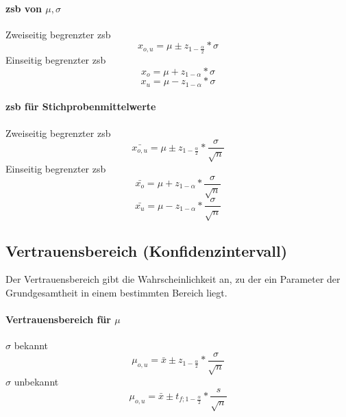 \documentclass{school}
\begin{document}
\paragraph{\gls{zsb} von $\mu,\sigma$}
\begin{outline}
\1 Zweiseitig begrenzter \gls{zsb}
$$x_{o,u} = \mu \pm z_{1 - \frac{\alpha}{2}} * \sigma$$
\1 Einseitig begrenzter \gls{zsb}
$$x_{o} = \mu + z_{1 - \alpha} * \sigma$$
$$x_{u} = \mu - z_{1 - \alpha} * \sigma$$
\end{outline}

\paragraph{\gls{zsb} für Stichprobenmittelwerte}
\begin{outline}
\1 Zweiseitig begrenzter \gls{zsb}
$$\bar{x_{o,u}} = \mu \pm z_{1 - \frac{\alpha}{2}} * \frac{\sigma}{\sqrt{n}}$$
\1 Einseitig begrenzter \gls{zsb}
$$\bar{x_{o}} = \mu + z_{1 - \alpha} * \frac{\sigma}{\sqrt{n}}$$
$$\bar{x_{u}} = \mu - z_{1 - \alpha} * \frac{\sigma}{\sqrt{n}}$$
\end{outline}

\begin{vardefs}
\end{vardefs}

\newpage
\subsection{Vertrauensbereich (Konfidenzintervall)}
Der Vertrauensbereich gibt die Wahrscheinlichkeit an, zu der ein Parameter der Grundgesamtheit in einem bestimmten Bereich liegt.

\paragraph{Vertrauensbereich für $\mu$}
\begin{outline}
\1 $\sigma$ bekannt
$$\mu_{o,u} = \bar{x} \pm z_{1-\frac{\alpha}{2}} * \frac{\sigma}{\sqrt{n}}$$
\1 $\sigma$ unbekannt
$$\mu_{o,u} = \bar{x} \pm t_{f;1-\frac{\alpha}{2}} * \frac{s}{\sqrt{n}}$$
\end{outline}
\end{document}
